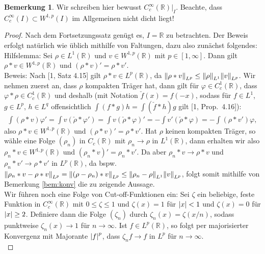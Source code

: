\documentclass[twoside]{article}
\theoremstyle{definition}
\newtheorem{remark}[theorem]{Bemerkung}
\begin{document}
\begin{remark}
Wir schreiben hier bewusst $C_c^\infty(\mathbb{R})|_I$. Beachte, dass $C_c^\infty(I)\subset W^{1,p}(I)$ im Allgemeinen nicht dicht liegt!
\end{remark}
\begin{proof}
Nach dem Fortsetzungssatz genügt es, $I = \mathbb{R}$ zu betrachten. Der Beweis erfolgt natürlich wie üblich mithilfe von Faltungen, dazu also zunächst folgendes:\\

Hilfslemma: Sei $\rho \in L^1(\mathbb{R})$ und $v \in W^{1,p}(\mathbb{R})$ mit $p \in [1,\infty]$. Dann gilt $\rho * v \in W^{1,p}(\mathbb{R})$ und $(\rho * v)' = \rho * v'$.\\
Beweis: Nach [1, Satz 4.15] gilt $\rho * v \in L^p(\mathbb{R})$, da $\norm{\rho * v}_{L^p} \leq \norm{\rho}_{L^1} \norm{v}_{L^p}$. Wir nehmen zuerst an, dass $\rho$ kompakten Träger hat, dann gilt für $\varphi \in C_c^1(\mathbb{R})$, dass $\varphi * \rho \in C_c^1(\mathbb{R})$ und deshalb (mit Notation $\check{f}(x) = f(-x)$, sodass für $f \in L^1$, $g \in L^p$, $h \in L^q$ offensichtlich $\int (f*g)h = \int (\check{f}*h) g$ gilt [1, Prop.\ 4.16]):
\begin{align*}
\int (\rho * v) \varphi' = \int v (\check{\rho} * \varphi') = \int v (\check{\rho} * \varphi)' = - \int v' (\check{\rho} * \varphi) = - \int (\rho * v') \varphi, 
\end{align*}
also $\rho * v \in W^{1,p}(\mathbb{R})$ und $(\rho * v)' = \rho * v'$. Hat $\rho$ keinen kompakten Träger, so wähle eine Folge $(\rho_n)$ in $C_c(\mathbb{R})$ mit $\rho_n \to \rho$ in $L^1(\mathbb{R})$, dann erhalten wir also  $\rho_n * v \in W^{1,p}(\mathbb{R})$ und $(\rho_n * v)' = \rho_n * v'$. Da aber $\rho_n * v \to \rho * v$ und $\rho_n * v' \to \rho * v'$ in $L^p(\mathbb{R})$, da bspw.\ $\norm{\rho_n * v - \rho * v}_{L^p} = \norm{(\rho-\rho_n)*v}_{L^p} \leq \norm{\rho_n-\rho}_{L^1} \norm{v}_{L^p}$, folgt somit mithilfe von Bemerkung \ref{bem:konv} die zu zeigende Aussage.\\

Wir führen noch eine Folge von Cut-off-Funktionen ein: Sei $\zeta$ ein beliebige, feste Funktion in $C_c^\infty(\mathbb{R})$ mit $0 \leq \zeta \leq 1$ und $\zeta(x) = 1$ für $\abs{x} < 1$ und $\zeta(x) = 0$ für $\abs{x} \geq 2$. Definiere dann die Folge $(\zeta_n)$ durch $\zeta_n(x) = \zeta(x/n)$, sodass punktweise $\zeta_n(x) \to 1$ für $n \to \infty$. Ist $f \in L^p(\mathbb{R})$, so folgt per majorisierter Konvergenz mit Majorante $\abs{f}^p$, dass $\zeta_n f \to f$ in $L^p$ für $n \to \infty$.\\


\end{proof}
\end{document}
